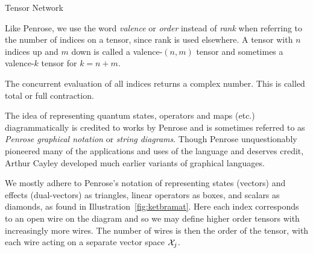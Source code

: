 \begin{paragraph}{Tensor Network}
\begin{remark}
Like Penrose, we use the word \emph{valence} or \emph{order} instead of \emph{rank} when referring to the number of indices on a tensor, since rank is used elsewhere.  A tensor with $n$ indices up and $m$ down is called a valence-$(n,m)$ tensor and sometimes a valence-$k$ tensor for $k=n+m$. 
\end{remark}

\begin{remark}
The concurrent evaluation of all indices returns a complex number.  This is called total or full contraction.
\end{remark}

\begin{remark}
The idea of representing quantum states, operators and maps (etc.) diagrammatically is credited to works by Penrose and is sometimes referred to as \textit{Penrose graphical notation} or \textit{string diagrams}.  Though Penrose unquestionably pioneered many of the applications and uses of the language and deserves credit, Arthur Cayley developed much earlier variants of graphical languages. 
\end{remark}



We mostly adhere to Penrose's notation of representing states (vectors) and effects (dual-vectors) as triangles, linear operators as boxes, and scalars as diamonds, as found in Illustration~\ref{fig:ketbramat}. Here each index corresponds to an open wire on the diagram and so we may define higher order tensors with increasingly more wires. The number of wires is then the order of the tensor, with each wire acting on a separate vector space ${\cal X}_j$.


\end{paragraph}
